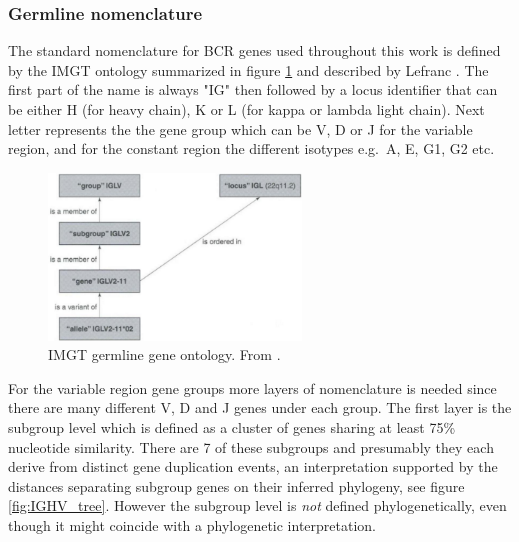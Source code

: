\subsubsection{Germline nomenclature}
The standard nomenclature for BCR genes used throughout this work is defined by the IMGT ontology summarized in figure \ref{fig:IMGT_classification} and described by Lefranc \cite{lefranc2001nomenclature}.
The first part of the name is always "IG" then followed by a locus identifier that can be either H (for heavy chain), K or L (for kappa or lambda light chain).
Next letter represents the the gene group which can be V, D or J for the variable region, and for the constant region the different isotypes e.g.\ A, E, G1, G2 etc.

\begin{figure}[ht]
    \centering
    \includegraphics[width=0.6\textwidth]{figures/IMGT_classification.png}
    \caption{
        \label{fig:IMGT_classification}
        IMGT germline gene ontology.
        From \cite{giudicelli1999ontology}.
    }
\end{figure}


For the variable region gene groups more layers of nomenclature is needed since there are many different V, D and J genes under each group.
The first layer is the subgroup level which is defined as a cluster of genes sharing at least 75\% nucleotide similarity.
There are 7 of these subgroups and presumably they each derive from distinct gene duplication events, an interpretation supported by the distances separating subgroup genes on their inferred phylogeny, see figure \ref{fig:IGHV_tree}.
However the subgroup level is \textit{not} defined phylogenetically, even though it might coincide with a phylogenetic interpretation.

